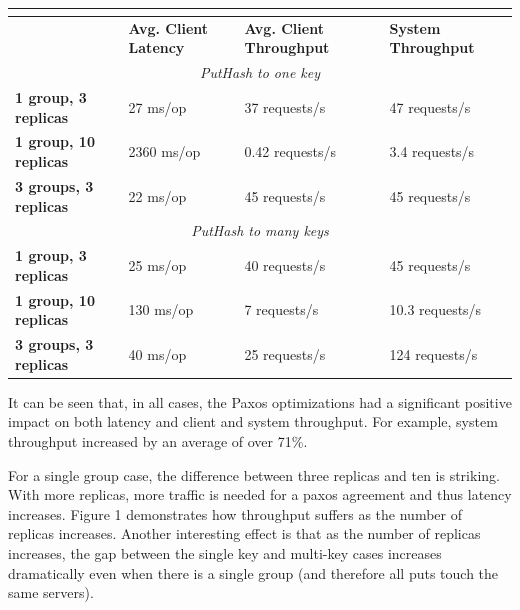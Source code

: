 \documentclass[letterpaper,10pt]{article}
\begin{document}
\begin{itemize}
\begin{table}
\begin{tabular}{|l|l|l|l|}
\hline
\multicolumn{4}{|c|}{\cellcolor[HTML]{C0C0C0}{\color[HTML]{000000} \textbf{Multipaxos}}}                              \\ \hline
                              & \textbf{Avg. Client Latency} & \textbf{Avg. Client Throughput} & \textbf{System Throughput} \\ \hline
\multicolumn{4}{|c|}{\textit{PutHash to one key}}                                                                     \\ \hline
\textbf{1 group, 3 replicas}  & 27 ms/op                     & 37 requests/s                & 47 requests/s           \\ \hline
\textbf{1 group, 10 replicas} & 2360 ms/op                   & 0.42 requests/s              & 3.4 requests/s          \\ \hline
\textbf{3 groups, 3 replicas} & 22 ms/op                     & 45 requests/s                & 45 requests/s           \\ \hline
\multicolumn{4}{|c|}{\textit{PutHash to many keys}}                                                                   \\ \hline
\textbf{1 group, 3 replicas}  & 25 ms/op                     & 40 requests/s                & 45 requests/s           \\ \hline
\textbf{1 group, 10 replicas} & 130 ms/op                    & 7 requests/s                 & 10.3 requests/s         \\ \hline
\textbf{3 groups, 3 replicas} & 40 ms/op                     & 25 requests/s                & 124 requests/s          \\ \hline
\end{tabular}
\end{table}

It can be seen that, in all cases, the Paxos optimizations had a significant positive impact on both latency and client and system throughput.  For example, system throughput increased by an average of over 71\%.

For a single group case, the difference between three replicas and ten is striking.  With more replicas, more traffic is needed for a paxos agreement and thus latency increases.  Figure 1 demonstrates how throughput suffers as the number of replicas increases.  Another interesting effect is that as the number of replicas increases, the gap between the single key and multi-key cases increases dramatically even when there is a single group (and therefore all puts touch the same servers).


\end{itemize}
\end{document}
